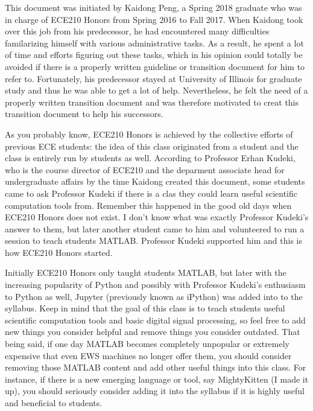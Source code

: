 \documentclass[12pt]{article}
\begin{document}
    This document was initiated by Kaidong Peng, a Spring 2018 graduate who was in charge of ECE210 Honors from Spring 2016 to Fall 2017. When Kaidong took over this job from his predecessor, he had encountered many difficulties familarizing himself with various administrative tasks. As a result, he spent a lot of time and efforts figuring out these tasks, which in his opinion could totally be avoided if there is a properly written guideline or transition document for him to refer to. Fortunately, his predecessor stayed at University of Illinois for graduate study and thus he was able to get a lot of help. Nevertheless, he felt the need of a properly written transition document and was therefore motivated to creat this transition document to help his successors.

    As you probably know, ECE210 Honors is achieved by the collective efforts of previous ECE students: the idea of this class originated from a student and the class is entirely run by students as well. According to Professor Erhan Kudeki, who is the course director of ECE210 and the deparment associate head for undergraduate affairs by the time Kaidong created this document, some students came to ask Professor Kudeki if there is a clas they could learn useful scientific computation tools from. Remember this happened in the good old days when ECE210 Honors does not exist. I don't know what was exactly Professor Kudeki\rq s answer to them, but later another student came to him and volunteered to run a session to teach students MATLAB. Professor Kudeki supported him and this is how ECE210 Honors started.

    Initially ECE210 Honors only taught students MATLAB, but later with the increasing popularity of Python and possibly with Professor Kudeki\rq s enthusiasm to Python as well, Jupyter (previously known as iPython) was added into to the syllabus. Keep in mind that the goal of this class is to teach students useful scientific computation tools and basic digital signal processing, so feel free to add new things you consider helpful and remove things you consider outdated. That being said, if one day MATLAB becomes completely unpopular or extremely expensive that even EWS machines no longer offer them, you should consider removing those MATLAB content and add other useful things into this class. For instance, if there is a new emerging language or tool, say MightyKitten (I made it up), you should seriously consider adding it into the syllabus if it is highly useful and beneficial to students.
\end{document}
